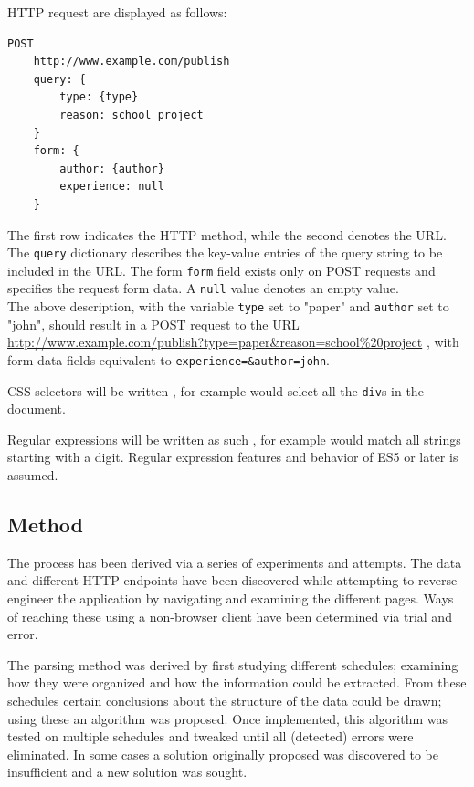 \documentclass{article}
\begin{document}
	HTTP request are displayed as follows:
	
	\newpage
	\begin{lstlisting}[language=HTTP, style=nonumbers]
	POST
	http://www.example.com/publish
	query: {
		type: {type}
		reason: school project
	}
	form: {
		author: {author}
		experience: null
	}
	\end{lstlisting}
	The first row indicates the HTTP method, while the second denotes the URL. The \texttt{query} dictionary describes the key-value entries of the query string to be included in the URL. The form \texttt{form} field exists only on POST requests and specifies the request form data. A \texttt{null} value denotes an empty value.\\
	The above description, with the variable \texttt{type} set to "paper" and \texttt{author} set to "john", should result in a POST request to the URL \url{http://www.example.com/publish?type=paper&reason=school%20project}%
	, with form data fields equivalent to \texttt{experience=\&author=john}.
	
	CSS selectors will be written , for example  would select all the \texttt{div}s in the document.
	
	Regular expressions will be written as such , for example \regex{^\d} would match all strings starting with a digit. Regular expression features and behavior of ES5 or later is assumed.
	
	\subsection{Method}
	The process has been derived via a series of experiments and attempts. The data and different HTTP endpoints have been discovered while attempting to reverse engineer the application by navigating and examining the different pages. Ways of reaching these using a non-browser client have been determined via trial and error.
	
	The parsing method was derived by first studying different schedules; examining how they were organized and how the information could be extracted. From these schedules certain conclusions about the structure of the data could be drawn; using these an algorithm was proposed. Once implemented, this algorithm was tested on multiple schedules and tweaked until all (detected) errors were eliminated. In some cases a solution originally proposed was discovered to be insufficient and a new solution was sought.
	
\end{document}
